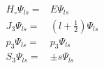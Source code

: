 \begin{equation}
\begin{array}{cc}
H_{\circ }\Psi _{ls}= & E\Psi _{ls} \\
J_{3}\Psi _{ls}= & \left( l+\frac{1}{2}\right) \Psi _{ls} \\
p_{3}\Psi _{ls}= & p_{3}\Psi _{ls} \\
S_{3}\Psi _{ls}= & \pm s\Psi _{ls}
\end{array}
\label{eq27}
\end{equation}

